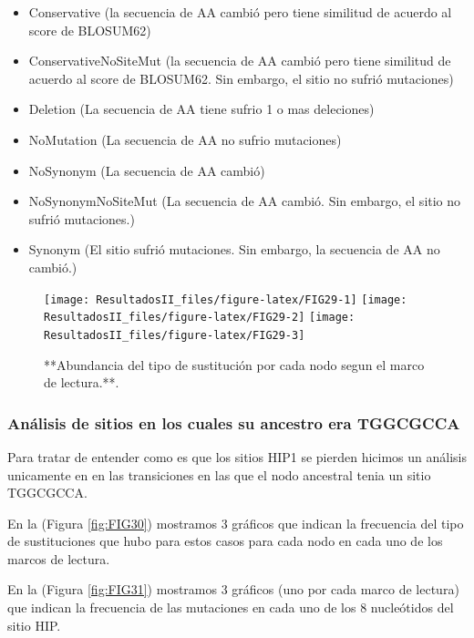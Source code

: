 \documentclass[
]{book}
\providecommand{\tightlist}{%
  \setlength{\itemsep}{0pt}\setlength{\parskip}{0pt}}
\begin{document}
\begin{itemize}
\tightlist
\item
  Conservative (la secuencia de AA cambió pero tiene similitud de acuerdo al score de BLOSUM62)
\item
  ConservativeNoSiteMut (la secuencia de AA cambió pero tiene similitud de acuerdo al score de BLOSUM62. Sin embargo, el sitio no sufrió mutaciones)
\item
  Deletion (La secuencia de AA tiene sufrio 1 o mas deleciones)
\item
  NoMutation (La secuencia de AA no sufrio mutaciones)
\item
  NoSynonym (La secuencia de AA cambió)
\item
  NoSynonymNoSiteMut (La secuencia de AA cambió. Sin embargo, el sitio no sufrió mutaciones.)
\item
  Synonym (El sitio sufrió mutaciones. Sin embargo, la secuencia de AA no cambió.)
\end{itemize}

\begin{figure}

{\centering \texttt{[image: ResultadosII\_files/figure-latex/FIG29-1]} \texttt{[image: ResultadosII\_files/figure-latex/FIG29-2]} \texttt{[image: ResultadosII\_files/figure-latex/FIG29-3]} 

}

\caption{**Abundancia del tipo de sustitución por cada nodo segun el marco de lectura.**.}\label{fig:FIG29}
\end{figure}

\hypertarget{anuxe1lisis-de-sitios-en-los-cuales-su-ancestro-era-tggcgcca}{%
\subsubsection{Análisis de sitios en los cuales su ancestro era TGGCGCCA}\label{anuxe1lisis-de-sitios-en-los-cuales-su-ancestro-era-tggcgcca}}

Para tratar de entender como es que los sitios HIP1 se pierden hicimos un análisis unicamente en en las transiciones en las que el nodo ancestral tenia un sitio TGGCGCCA.

En la (Figura \ref{fig:FIG30}) mostramos 3 gráficos que indican la frecuencia del tipo de sustituciones que hubo para estos casos para cada nodo en cada uno de los marcos de lectura.

En la (Figura \ref{fig:FIG31}) mostramos 3 gráficos (uno por cada marco de lectura) que indican la frecuencia de las mutaciones en cada uno de los 8 nucleótidos del sitio HIP.
\end{document}
